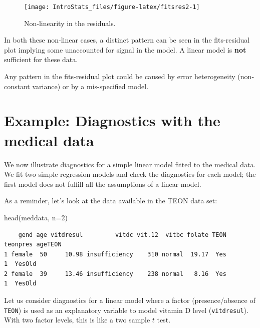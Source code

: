 \documentclass[
  oneside]{krantz}
\newenvironment{Shaded}{\begin{snugshade}}{\end{snugshade}}
\newcommand{\AttributeTok}[1]{\textcolor[rgb]{0.77,0.63,0.00}{#1}}
\newcommand{\DecValTok}[1]{\textcolor[rgb]{0.00,0.00,0.81}{#1}}
\newcommand{\FunctionTok}[1]{\textcolor[rgb]{0.00,0.00,0.00}{#1}}
\newcommand{\NormalTok}[1]{#1}
\begin{document}
\begin{figure}

{\centering \texttt{[image: IntroStats\_files/figure-latex/fitsres2-1]} 

}

\caption{Non-linearity in the residuals.}\label{fig:fitsres2}
\end{figure}

In both these non-linear cases, a distinct pattern can be seen in the fits-residual plot implying some unaccounted for signal in the model. A linear model is \textbf{not} sufficient for these data.

Any pattern in the fits-residual plot could be caused by error heterogeneity (non-constant variance) or by a mis-specified model.

\hypertarget{example-diagnostics-with-the-medical-data}{%
\section{Example: Diagnostics with the medical data}\label{example-diagnostics-with-the-medical-data}}

We now illustrate diagnostics for a simple linear model fitted to the medical data. We fit two simple regression models and check the diagnostics for each model; the first model does not fulfill all the assumptions of a linear model.

As a reminder, let's look at the data available in the TEON data set:

\begin{Shaded}
\begin{Highlighting}[]
\FunctionTok{head}\NormalTok{(meddata, }\AttributeTok{n=}\DecValTok{2}\NormalTok{)}
\end{Highlighting}
\end{Shaded}

\begin{verbatim}
    gend age vitdresul         vitdc vit.12  vitbc folate TEON teonpres ageTEON
1 female  50     10.98 insufficiency    310 normal  19.17  Yes        1  YesOld
2 female  39     13.46 insufficiency    238 normal   8.16  Yes        1  YesOld
\end{verbatim}

Let us consider diagnostics for a linear model where a factor (presence/absence of \texttt{TEON}) is used as an explanatory variable to model vitamin D level (\texttt{vitdresul}). With two factor levels, this is like a two sample \(t\) test.
\end{document}
